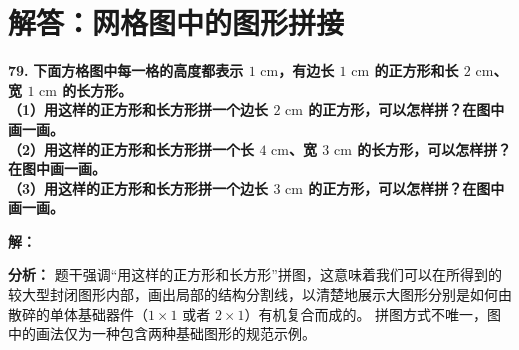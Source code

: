 \newpage


\section{解答：网格图中的图形拼接}

\vspace{0.6cm}

\textbf{\LARGE 79.} \textbf{下面方格图中每一格的高度都表示 $1\text{ cm}$，有边长 $1\text{ cm}$ 的正方形和长 $2\text{ cm}$、宽 $1\text{ cm}$ 的长方形。\\[1ex]
（1）用这样的正方形和长方形拼一个边长 $2\text{ cm}$ 的正方形，可以怎样拼？在图中画一画。\\[1ex]
（2）用这样的正方形和长方形拼一个长 $4\text{ cm}$、宽 $3\text{ cm}$ 的长方形，可以怎样拼？在图中画一画。\\[1ex]
（3）用这样的正方形和长方形拼一个边长 $3\text{ cm}$ 的正方形，可以怎样拼？在图中画一画。}

\vspace{0.4cm}
\textbf{解：}

\textbf{分析：}
题干强调“用这样的正方形和长方形”拼图，这意味着我们可以在所得到的较大型封闭图形内部，画出局部的结构分割线，以清楚地展示大图形分别是如何由散碎的单体基础器件（$1\times 1$ 或者 $2\times 1$）有机复合而成的。
拼图方式不唯一，图中的画法仅为一种包含两种基础图形的规范示例。

